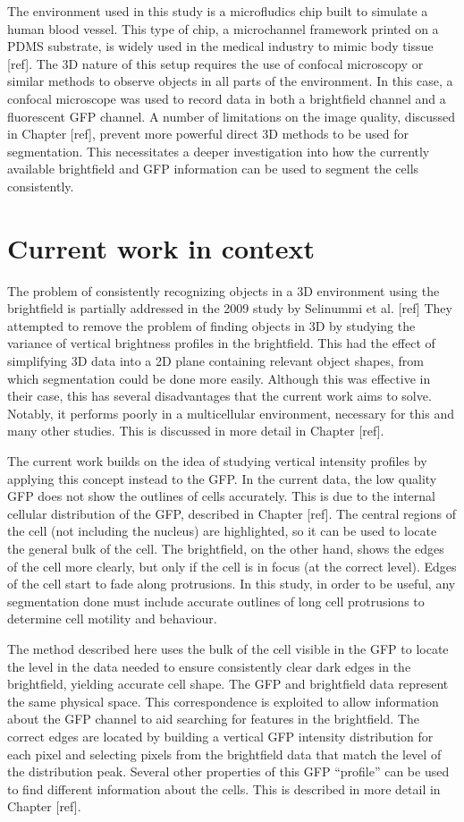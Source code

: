 The environment used in this study is a microfludics chip built to simulate a human blood vessel. This type of chip, a microchannel framework printed on a PDMS substrate, is widely used in the medical industry to mimic body tissue [ref]. The 3D nature of this setup requires the use of confocal microscopy or similar methods to observe objects in all parts of the environment. In this case, a confocal microscope was used to record data in both a brightfield channel and a fluorescent GFP channel. A number of limitations on the image quality, discussed in Chapter [ref], prevent more powerful direct 3D methods to be used for segmentation. This necessitates a deeper investigation into how the currently available brightfield and GFP information can be used to segment the cells consistently.

\section{Current work in context}

The problem of consistently recognizing objects in a 3D environment using the brightfield is partially addressed in the 2009 study by Selinummi et al. [ref] They attempted to remove the problem of finding objects in 3D by studying the variance of vertical brightness profiles in the brightfield. This had the effect of simplifying 3D data into a 2D plane containing relevant object shapes, from which segmentation could be done more easily. Although this was effective in their case, this has several disadvantages that the current work aims to solve. Notably, it performs poorly in a multicellular environment, necessary for this and many other studies. This is discussed in more detail in Chapter [ref].

The current work builds on the idea of studying vertical intensity profiles by applying this concept instead to the GFP. In the current data, the low quality GFP does not show the outlines of cells accurately. This is due to the internal cellular distribution of the GFP, described in Chapter [ref]. The central regions of the cell (not including the nucleus) are highlighted, so it can be used to locate the general bulk of the cell. The brightfield, on the other hand, shows the edges of the cell more clearly, but only if the cell is in focus (at the correct level). Edges of the cell start to fade along protrusions. In this study, in order to be useful, any segmentation done must include accurate outlines of long cell protrusions to determine cell motility and behaviour.

The method described here uses the bulk of the cell visible in the GFP to locate the level in the data needed to ensure consistently clear dark edges in the brightfield, yielding accurate cell shape. The GFP and brightfield data represent the same physical space. This correspondence is exploited to allow information about the GFP channel to aid searching for features in the brightfield. The correct edges are located by building a vertical GFP intensity distribution for each pixel and selecting pixels from the brightfield data that match the level of the distribution peak. Several other properties of this GFP ``profile'' can be used to find different information about the cells. This is described in more detail in Chapter [ref].
